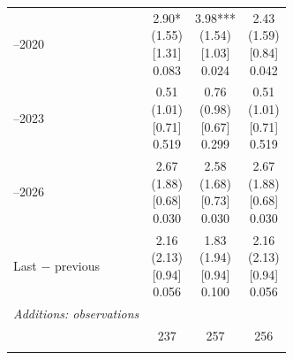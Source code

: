 \begin{threeparttable}
\begin{tabular}{@{}lccc}
\addlinespace[0.25ex]
\addlinespace[0.25ex]
2018–2020 & \makecell{2.90*\\(1.55)\\{}[1.31]\\{0.083}} & \makecell{3.98***\\(1.54)\\{}[1.03]\\{0.024}} & \makecell{2.43\\(1.59)\\{}[0.84]\\{0.042}} \\
\addlinespace[0.25ex]
\addlinespace[0.25ex]
2021–2023 & \makecell{0.51\\(1.01)\\{}[0.71]\\{0.519}} & \makecell{0.76\\(0.98)\\{}[0.67]\\{0.299}} & \makecell{0.51\\(1.01)\\{}[0.71]\\{0.519}} \\
\addlinespace[0.25ex]
\addlinespace[0.25ex]
2024–2026 & \makecell{2.67\\(1.88)\\{}[0.68]\\{0.030}} & \makecell{2.58\\(1.68)\\{}[0.73]\\{0.030}} & \makecell{2.67\\(1.88)\\{}[0.68]\\{0.030}} \\
\addlinespace[0.25ex]
\addlinespace[0.25ex]
Last $-$ previous & \makecell{2.16\\(2.13)\\{}[0.94]\\{0.056}} & \makecell{1.83\\(1.94)\\{}[0.94]\\{0.100}} & \makecell{2.16\\(2.13)\\{}[0.94]\\{0.056}} \\
\addlinespace[0.25ex]
\midrule
\emph{Additions: observations} \\
\addlinespace[0.25ex]
\addlinespace[1ex]
 & 237 & 257 & 256 \\
\addlinespace[0.25ex]

\end{tabular}
\end{threeparttable}

